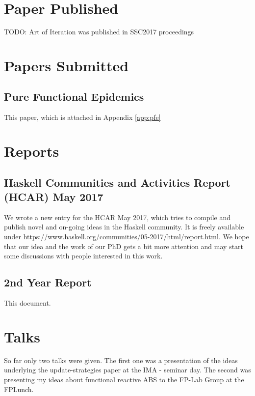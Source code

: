 \section{Paper Published}
TODO: Art of Iteration was published in SSC2017 proceedings

\section{Papers Submitted}
\subsection{Pure Functional Epidemics}
This paper, which is attached in Appendix \ref{app:pfe}

\section{Reports}
\subsection{Haskell Communities and Activities Report (HCAR) May 2017}
We wrote a new entry for the HCAR May 2017, which tries to compile and publish novel and on-going ideas in the Haskell community. It is freely available under \url{https://www.haskell.org/communities/05-2017/html/report.html}. We hope that our idea and the work of our PhD gets a bit more attention and may start some discussions with people interested in this work.

\subsection{2nd Year Report}
This document.


\section{Talks}
So far only two talks were given. The first one was a presentation of the ideas underlying the update-strategies paper at the IMA - seminar day. The second was presenting my ideas about functional reactive ABS to the FP-Lab Group at the FPLunch.

